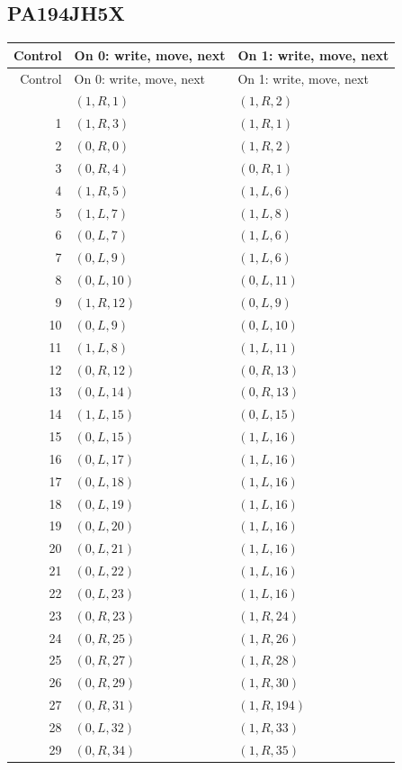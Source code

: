\subsection{PA194JH5X}
\begingroup\small
\begin{longtable}{@{}rll@{}}
\toprule Control & On 0: write, move, next & On 1: write, move, next\\
\midrule\endfirsthead
\toprule Control & On 0: write, move, next & On 1: write, move, next\\
\midrule\endhead
\bottomrule\endfoot
0 & $(1,R,1)$ & $(1,R,2)$\\
1 & $(1,R,3)$ & $(1,R,1)$\\
2 & $(0,R,0)$ & $(1,R,2)$\\
3 & $(0,R,4)$ & $(0,R,1)$\\
4 & $(1,R,5)$ & $(1,L,6)$\\
5 & $(1,L,7)$ & $(1,L,8)$\\
6 & $(0,L,7)$ & $(1,L,6)$\\
7 & $(0,L,9)$ & $(1,L,6)$\\
8 & $(0,L,10)$ & $(0,L,11)$\\
9 & $(1,R,12)$ & $(0,L,9)$\\
10 & $(0,L,9)$ & $(0,L,10)$\\
11 & $(1,L,8)$ & $(1,L,11)$\\
12 & $(0,R,12)$ & $(0,R,13)$\\
13 & $(0,L,14)$ & $(0,R,13)$\\
14 & $(1,L,15)$ & $(0,L,15)$\\
15 & $(0,L,15)$ & $(1,L,16)$\\
16 & $(0,L,17)$ & $(1,L,16)$\\
17 & $(0,L,18)$ & $(1,L,16)$\\
18 & $(0,L,19)$ & $(1,L,16)$\\
19 & $(0,L,20)$ & $(1,L,16)$\\
20 & $(0,L,21)$ & $(1,L,16)$\\
21 & $(0,L,22)$ & $(1,L,16)$\\
22 & $(0,L,23)$ & $(1,L,16)$\\
23 & $(0,R,23)$ & $(1,R,24)$\\
24 & $(0,R,25)$ & $(1,R,26)$\\
25 & $(0,R,27)$ & $(1,R,28)$\\
26 & $(0,R,29)$ & $(1,R,30)$\\
27 & $(0,R,31)$ & $(1,R,194)$\\
28 & $(0,L,32)$ & $(1,R,33)$\\
29 & $(0,R,34)$ & $(1,R,35)$\\

\end{longtable}

